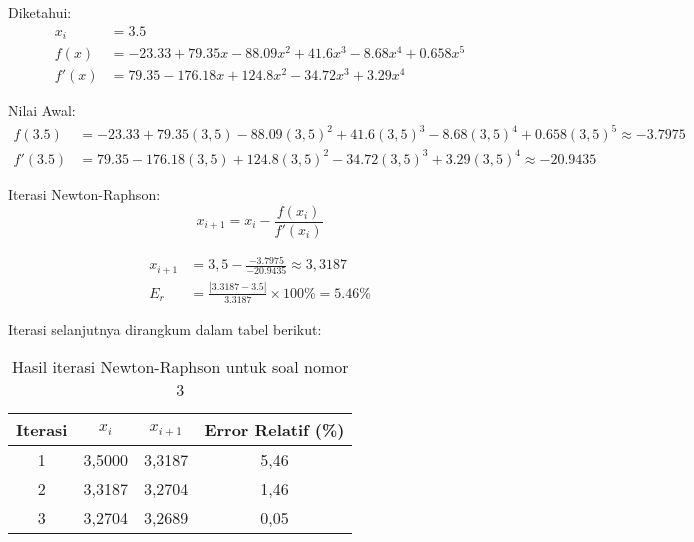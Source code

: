 \documentclass{article}
\begin{document}
\begin{enumerate}
    Diketahui: \\
    \begin{equation*}
    \begin{split}
        x_i & = \num{3,5} \\
        f(x) & = -\num{23,33} + \num{79,35}x - \num{88,09}x^2 + \num{41,6}x^3 - \num{8,68}x^4 + \num{0,658}x^5 \\
        f'(x) & = \num{79,35} - \num{176,18}x + \num{124,8}x^2 - \num{34,72}x^3 + \num{3,29}x^4
    \end{split}
    \end{equation*}
    
    Nilai Awal: \\
    \begin{equation*}
    \begin{split}
        f(\num{3,5}) & = -\num{23,33} + \num{79,35}(3,5) - \num{88,09}(3,5)^2 + \num{41,6}(3,5)^3 - \num{8,68}(3,5)^4 + \num{0,658}(3,5)^5 \approx -\num{3,7975} \\
        f'(\num{3,5}) & = \num{79,35} - \num{176,18}(3,5) + \num{124,8}(3,5)^2 - \num{34,72}(3,5)^3 + \num{3,29}(3,5)^4 \approx -\num{20,9435}
    \end{split}
    \end{equation*}
    
    Iterasi Newton-Raphson:
    \begin{equation*}
        x_{i+1} = x_i - \frac{f(x_i)}{f'(x_i)}
    \end{equation*}
    
    \begin{equation*}
    \begin{split}
        x_{i+1} & = 3,5 - \frac{-\num{3,7975}}{-\num{20,9435}} \approx 3,3187 \\
        E_r & = \frac{|\num{3,3187} - \num{3,5}|}{\num{3,3187}} \times 100\% = \num{5,46}\%
    \end{split}
    \end{equation*}
    
    Iterasi selanjutnya dirangkum dalam tabel berikut:
    \begin{table}[h]
        \centering
        \begin{tabular}{cccc}
            \toprule
            Iterasi & $x_i$ & $x_{i+1}$ & Error Relatif (\%) \\
            \midrule
            1 & 3,5000 & 3,3187 & 5,46 \\
            2 & 3,3187 & 3,2704 & 1,46 \\
            3 & 3,2704 & 3,2689 & 0,05 \\
            \bottomrule
        \end{tabular}
        \caption{Hasil iterasi Newton-Raphson untuk soal nomor 3}
        \label{tab:iterasi3}
    \end{table}
    

\end{enumerate}
\end{document}
